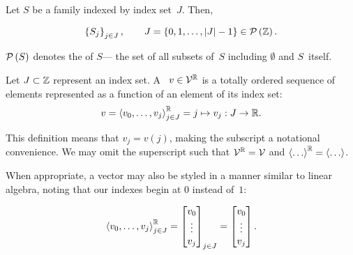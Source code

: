 \begin{definition}
  Let $S$ be a family indexed by index set~$J$.
  Then,

  \begin{align}
    \left\{S_{j}\right\}_{j\in J},\qquad J = \left\{0,1,\dots,\left|J\right|-1\right\}\in\mathcal{P}\left(\mathbb{Z}\right).
  \end{align}
\end{definition}

$\mathcal{P}\left(S\right)$ denotes the  of $S$---%
  the set of all subsets of~$S$ including $\emptyset$ and $S$~itself.

\indexsym{}
\indexsym{}
\begin{definition}[Vector]
  Let $J\subset\mathbb{Z}$ represent an index set.
  A ~$v\in\mathcal{V}^{\mathbb{R}}$ is a totally ordered sequence of
   elements represented as a function of an element of its index set:
  \begin{equation}\label{vec}
    v = \left\langle v_0,\ldots,v_j\right\rangle^{\mathbb{R}}_{j\in J}
      = j \mapsto v_j : J \rightarrow \mathbb{R}.
  \end{equation}
\end{definition}

This definition means that $v_j = v(j)$,
  making the subscript a notational convenience.
We may omit the superscript such that $\mathcal{V}^{\mathbb{R}}=\mathcal{V}$
  and $\left\langle\ldots\right\rangle^{\mathbb{R}}=\left\langle\ldots\right\rangle$.

When appropriate,
  a vector may also be styled in a manner similar to linear algebra,
    noting that our indexes begin at $0$ instead of~$1$:

\begin{equation}
  \left\langle v_0,\dots,v_j\right\rangle^{\mathbb{R}}_{j\in J} =
  \begin{bmatrix}
    v_0 \\
    \vdots \\
    v_j
  \end{bmatrix}_{j\in J}
  =
  \begin{bmatrix}
    v_0 \\
    \vdots \\
    v_j
  \end{bmatrix}.
\end{equation}

